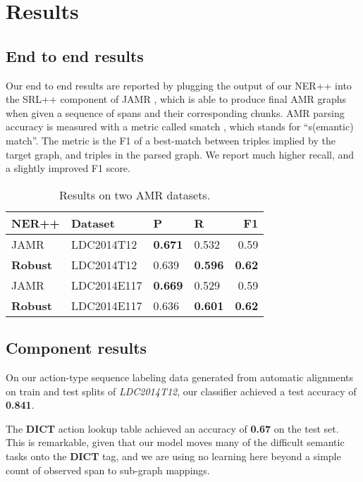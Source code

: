 \documentclass[11pt]{article}
\begin{document}
% 

\section{Results}

\subsection{End to end results}

Our end to end results are reported by plugging the output of our NER++ into the SRL++ component of JAMR \cite{Flanigan:14}, which is able to produce final AMR graphs when given a sequence of spans and their corresponding chunks. AMR parsing accuracy is measured with a metric called smatch \needcite, which stands for ``s(emantic) match''. The metric is the F1 of a best-match between triples implied by the target graph, and triples in the parsed graph. We report much higher recall, and a slightly improved F1 score.

\begin{table}[h]
\begin{center}
\begin{tabular}{|l|l|l|l|r|}
\hline NER++ & Dataset & P & R & \bf F1 \\ \hline
JAMR & LDC2014T12 & \textbf{0.671} & 0.532 & 0.59 \\
\textbf{Robust} & LDC2014T12 & 0.639 & \textbf{0.596} & \textbf{0.62} \\
JAMR & LDC2014E117 & \textbf{0.669} & 0.529 & 0.59 \\
\bf Robust & LDC2014E117 & 0.636 & \textbf{0.601} & \textbf{0.62} \\
\hline
\end{tabular}
\end{center}
\caption{\label{font-table} Results on two AMR datasets. }
\end{table}


\subsection{Component results}

On our action-type sequence labeling data generated from automatic alignments on train and test splits of \textit{LDC2014T12}, our classifier achieved a test accuracy of \textbf{0.841}.

The \textbf{DICT} action lookup table achieved an accuracy of \textbf{0.67} on the test set. This is remarkable, given that our model moves many of the difficult semantic tasks onto the \textbf{DICT} tag, and we are using no learning here beyond a simple count of observed span to sub-graph mappings.
\end{document}
